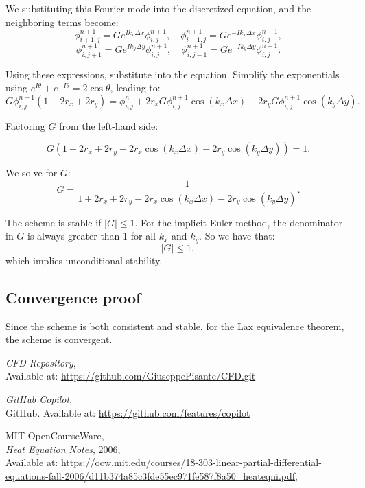\documentclass{article}
\begin{document}
We substituting this Fourier mode into the discretized equation, and the neighboring terms become:
\begin{equation*}
\phi_{i+1,j}^{n+1} = G e^{I k_x \Delta x} \phi_{i,j}^{n+1}, \quad \phi_{i-1,j}^{n+1} = G e^{-I k_x \Delta x} \phi_{i,j}^{n+1},
\end{equation*}
\begin{equation*}
\phi_{i,j+1}^{n+1} = G e^{I k_y \Delta y} \phi_{i,j}^{n+1}, \quad \phi_{i,j-1}^{n+1} = G e^{-I k_y \Delta y} \phi_{i,j}^{n+1}.
\end{equation*}

Using these expressions, substitute into the equation. Simplify the exponentials using $ e^{I \theta} + e^{-I \theta} = 2 \cos \theta $, leading to:
\begin{equation*}
G \phi_{i,j}^{n+1} \left( 1 + 2r_x + 2r_y \right) = \phi_{i,j}^n + 2r_x G \phi_{i,j}^{n+1} \cos(k_x \Delta x) + 2r_y G \phi_{i,j}^{n+1} \cos(k_y \Delta y).
\end{equation*}

Factoring $G$ from the left-hand side:

\begin{equation*}
G \left( 1 + 2r_x + 2r_y - 2r_x \cos(k_x \Delta x) - 2r_y \cos(k_y \Delta y) \right) = 1.
\end{equation*}

We solve for $ G $:
\begin{equation*}
G = \frac{1}{1 + 2r_x + 2r_y - 2r_x \cos(k_x \Delta x) - 2r_y \cos(k_y \Delta y)}.
\end{equation*}

The scheme is stable if $ |G| \leq 1 $. For the implicit Euler method, the denominator in $ G $ is always greater than 1 for all $ k_x $ and $ k_y $. So we have that:
\begin{equation}
|G| \leq 1,
\end{equation}
which implies unconditional stability.

\subsection{Convergence proof}
Since the scheme is both consistent and stable, for the Lax equivalence theorem, the scheme is convergent.


\begin{thebibliography}{9}
  \textit{CFD Repository},\\
  Available at: \url{https://github.com/GiuseppePisante/CFD.git}
  
  \textit{GitHub Copilot},\\
  GitHub. Available at: \url{https://github.com/features/copilot}
  
  MIT OpenCourseWare,\\
  \textit{Heat Equation Notes}, 2006,\\
  Available at: \url{https://ocw.mit.edu/courses/18-303-linear-partial-differential-equations-fall-2006/d11b374a85c3fde55ec971fe587f8a50_heateqni.pdf},\\
\end{thebibliography}
\end{document}
